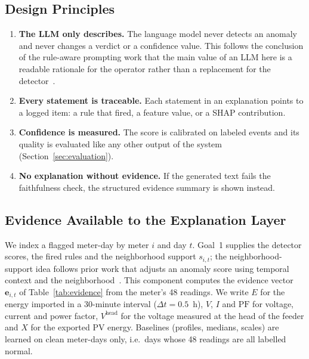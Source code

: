 \documentclass[11pt,a4paper]{article}
\begin{document}
\subsection{Design Principles}
\begin{enumerate}[leftmargin=*,itemsep=2pt]
  \item \textbf{The LLM only describes.} The language model never detects an anomaly and never changes a verdict or a confidence value. This follows the conclusion of the rule-aware prompting work that the main value of an LLM here is a readable rationale for the operator rather than a replacement for the detector~\cite{ruleaware}.
  \item \textbf{Every statement is traceable.} Each statement in an explanation points to a logged item: a rule that fired, a feature value, or a SHAP contribution.
  \item \textbf{Confidence is measured.} The score is calibrated on labeled events and its quality is evaluated like any other output of the system (Section~\ref{sec:evaluation}).
  \item \textbf{No explanation without evidence.} If the generated text fails the faithfulness check, the structured evidence summary is shown instead.
\end{enumerate}

\subsection{Evidence Available to the Explanation Layer}
\label{sec:evidence}
We index a flagged meter-day by meter $i$ and day $t$. Goal~1 supplies the detector scores, the fired rules
and the neighborhood support $s_{i,t}$; the neighborhood-support idea follows prior work that adjusts an
anomaly score using temporal context and the neighborhood~\cite{multiuser}. This component computes the
evidence vector $\mathbf{e}_{i,t}$ of Table~\ref{tab:evidence} from the meter's 48 readings. We write $E$ for
the energy imported in a 30-minute interval ($\Delta t=0.5$~h), $V$, $I$ and $\mathrm{PF}$ for voltage,
current and power factor, $V^{\mathrm{head}}$ for the voltage measured at the head of the feeder and $X$ for
the exported PV energy. Baselines (profiles, medians, scales) are learned on clean meter-days only, i.e.\ days
whose 48 readings are all labelled normal.
\end{document}
